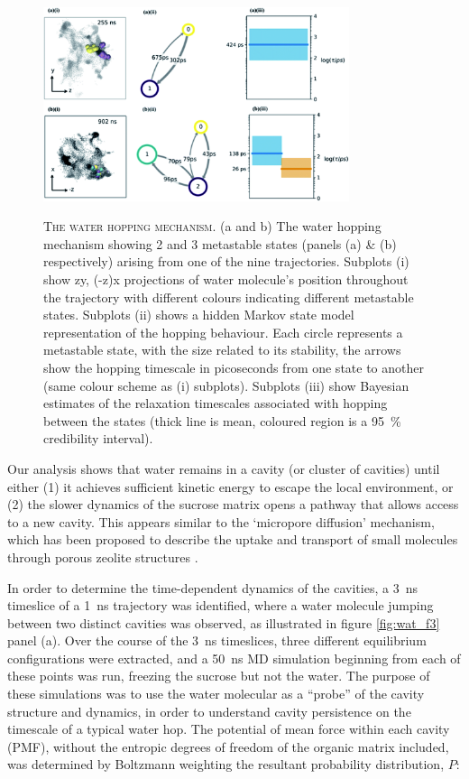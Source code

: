 \begin{figure}
    \centering
    \caption[The water hopping mechanism]{\textsc{The water hopping mechanism}. (a and b) The water hopping mechanism showing 2 and 3 metastable states (panels (a) \& (b) respectively) arising from one of the nine trajectories. Subplots (i) show zy, (-z)x projections of water molecule's position throughout the trajectory with different colours indicating different metastable states. Subplots (ii) shows a hidden Markov state model representation of the hopping behaviour. Each circle represents a metastable state, with the size related to its stability, the arrows show the hopping timescale in picoseconds from one state to another (same colour scheme as (i) subplots). Subplots (iii) show Bayesian estimates of the relaxation timescales associated with hopping between the states (thick line is mean, coloured region is a \SI{95}{\percent} credibility interval).}
    \includegraphics[width=0.8\textwidth]{chapters/water_hopping/figures/f4.png}
    \label{fig:wat_f4}
\end{figure}

Our analysis shows that water remains in a cavity (or cluster of cavities) until either (1) it achieves sufficient kinetic energy to escape the local environment, or (2) the slower dynamics of the sucrose matrix opens a pathway that allows access to a new cavity. This appears similar to the `micropore diffusion’ mechanism, which has been proposed to describe the uptake and transport of small molecules through porous zeolite structures \cite{Krishna1997}.

In order to determine the time-dependent dynamics of the cavities, a \SI{3}{\nano\second} timeslice of a \SI{1}{\nano\second} trajectory was identified, where a water molecule jumping between two distinct cavities was observed, as illustrated in figure \ref{fig:wat_f3} panel (a). Over the course of the \SI{3}{\nano\second} timeslices,  three different equilibrium configurations were extracted, and a \SI{50}{\nano\second} MD simulation beginning from each of these points was run, freezing the sucrose but not the water. The purpose of these simulations was to use the water molecular as a ``probe'' of the cavity structure and dynamics, in order to understand cavity persistence on the timescale of a typical water hop. The potential of mean force within each cavity (PMF), without the entropic degrees of freedom of the organic matrix included, was determined by Boltzmann weighting the resultant probability distribution, $P$: 

